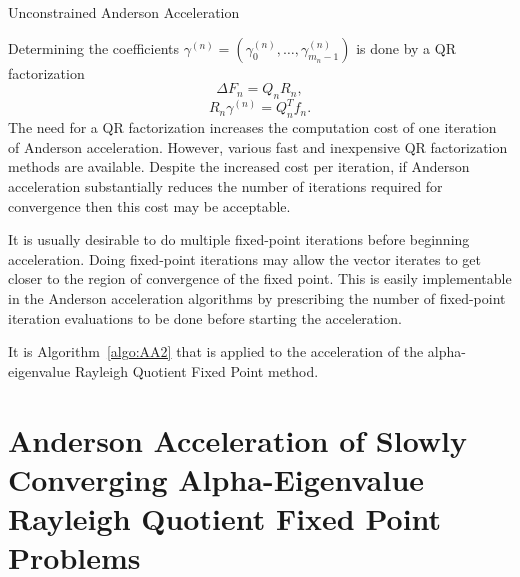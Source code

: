 \begin{algorithm}[!htbp]
	\caption{Unconstrained Anderson Acceleration}
	\label{algo:AA2}
	\begin{algorithmic}
		\ENDFOR
	\end{algorithmic}
\end{algorithm}
Determining the coefficients $\gamma^{(n)} = (\gamma_{0}^{(n)}, \dots, \gamma_{m_{n}-1}^{(n)})$ is done by a QR factorization
\begin{equation}
	\Delta F_{n} = Q_{n}R_{n},
\end{equation}
\begin{equation}
	R_{n} \gamma^{(n)} = Q_{n}^{T}f_{n}.
\end{equation}
The need for a QR factorization increases the computation cost of one iteration of Anderson acceleration. However, various fast and inexpensive QR factorization methods are available. Despite the increased cost per iteration, if Anderson acceleration substantially reduces the number of iterations required for convergence then this cost may be acceptable.

It is usually desirable to do multiple fixed-point iterations before beginning acceleration. Doing fixed-point iterations may allow the vector iterates to get closer to the region of convergence of the fixed point. This is easily implementable in the Anderson acceleration algorithms by prescribing the number of fixed-point iteration evaluations to be done before starting the acceleration.

It is Algorithm~\ref{algo:AA2} that is applied to the acceleration of the alpha-eigenvalue Rayleigh Quotient Fixed Point method.

\section{Anderson Acceleration of Slowly Converging Alpha-Eigenvalue Rayleigh Quotient Fixed Point Problems}

